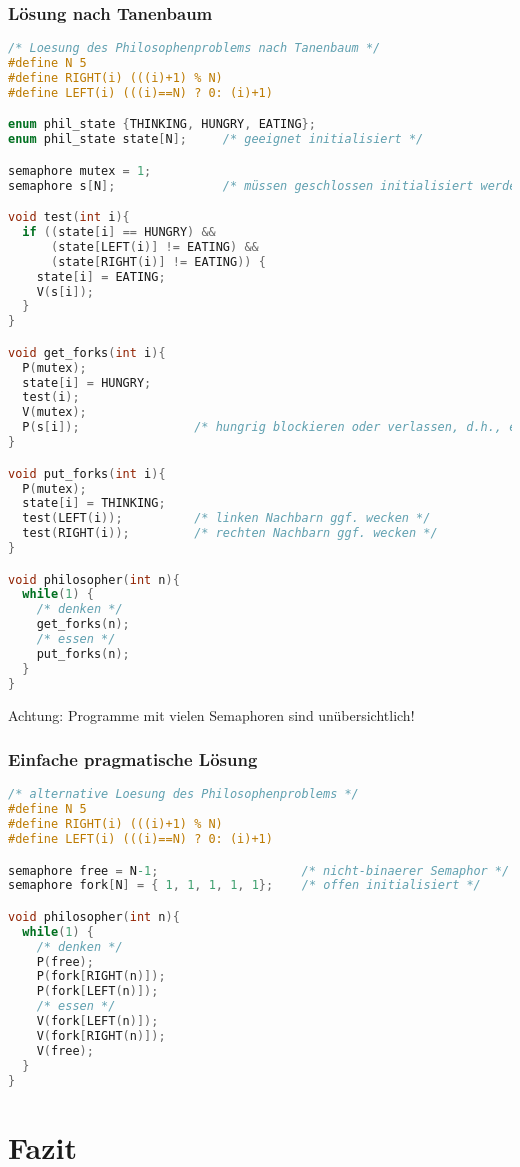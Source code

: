 \subsubsection*{Lösung nach Tanenbaum}
\begin{lstlisting}[language=C]
/* Loesung des Philosophenproblems nach Tanenbaum */
#define N 5
#define RIGHT(i) (((i)+1) % N)
#define LEFT(i) (((i)==N) ? 0: (i)+1)

enum phil_state {THINKING, HUNGRY, EATING};
enum phil_state state[N];     /* geeignet initialisiert */

semaphore mutex = 1;  
semaphore s[N];               /* müssen geschlossen initialisiert werden */

void test(int i){
  if ((state[i] == HUNGRY) &&
      (state[LEFT(i)] != EATING) &&
      (state[RIGHT(i)] != EATING)) {
    state[i] = EATING;
    V(s[i]);
  }
}

void get_forks(int i){
  P(mutex);
  state[i] = HUNGRY;
  test(i);
  V(mutex);
  P(s[i]);                /* hungrig blockieren oder verlassen, d.h., essen */
}

void put_forks(int i){
  P(mutex);
  state[i] = THINKING;
  test(LEFT(i));          /* linken Nachbarn ggf. wecken */
  test(RIGHT(i));         /* rechten Nachbarn ggf. wecken */
}

void philosopher(int n){
  while(1) {
    /* denken */
    get_forks(n);
    /* essen */
    put_forks(n); 
  }
}
\end{lstlisting}
Achtung: Programme mit vielen Semaphoren sind unübersichtlich!

\subsubsection*{Einfache pragmatische Lösung}
\begin{lstlisting}[language=C]
/* alternative Loesung des Philosophenproblems */
#define N 5
#define RIGHT(i) (((i)+1) % N)
#define LEFT(i) (((i)==N) ? 0: (i)+1)

semaphore free = N-1;                    /* nicht-binaerer Semaphor */  
semaphore fork[N] = { 1, 1, 1, 1, 1};    /* offen initialisiert */

void philosopher(int n){
  while(1) {
    /* denken */
    P(free);
    P(fork[RIGHT(n)]);
    P(fork[LEFT(n)]);
    /* essen */
    V(fork[LEFT(n)]);
    V(fork[RIGHT(n)]);
    V(free);
  }
}
\end{lstlisting}

\section{Fazit}

